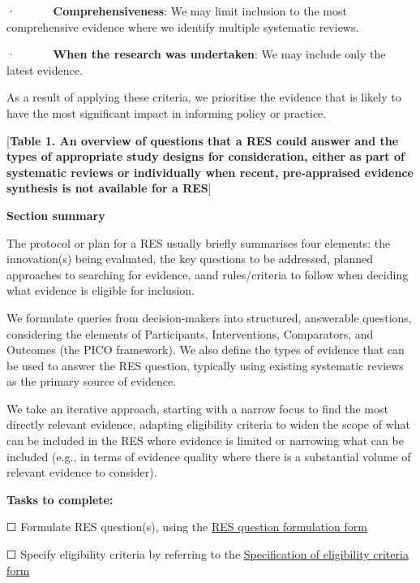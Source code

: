 \documentclass[
  letterpaper,
  DIV=11,
  numbers=noendperiod]{scrreprt}
\begin{document}
·~~~~~~ \textbf{Comprehensiveness}: We may limit inclusion to the most
comprehensive evidence where we identify multiple systematic reviews.

·~~~~~~ \textbf{When the research was undertaken}: We may include only
the latest evidence.

As a result of applying these criteria, we prioritise the evidence that
is likely to have the most significant impact in informing policy or
practice.

{[}\textbf{Table 1. An overview of questions that a RES could answer and
the types of appropriate study designs for consideration, either as part
of systematic reviews or individually when recent, pre-appraised
evidence synthesis is not available for a RES}{]}

\textbf{Section summary}

The protocol or plan for a RES usually briefly summarises four elements:
the innovation(s) being evaluated, the key questions to be addressed,
planned approaches to searching for evidence, aand rules/criteria to
follow when deciding what evidence is eligible for inclusion.

We formulate queries from decision-makers into structured, answerable
questions, considering the elements of Participants, Interventions,
Comparators, and Outcomes (the PICO framework). We also define the types
of evidence that can be used to answer the RES question, typically using
existing systematic reviews as the primary source of evidence.

We take an iterative approach, starting with a narrow focus to find the
most directly relevant evidence, adapting eligibility criteria to widen
the scope of what can be included in the RES where evidence is limited
or narrowing what can be included (e.g., in terms of evidence quality
where there is a substantial volume of relevant evidence to consider).

\textbf{Tasks to complete:}

☐ Formulate RES question(s), using the
\href{https://livemanchesterac-my.sharepoint.com/personal/chunhu_shi_manchester_ac_uk/Documents/Documents/Research/Projects/RES/Admin/RES\%20question\%20formulation\%20form.docx}{RES
question formulation form}

☐ Specify eligibility criteria by referring to the
\href{https://livemanchesterac-my.sharepoint.com/personal/chunhu_shi_manchester_ac_uk/Documents/Documents/Research/Projects/RES/Manual/Specification\%20of\%20eligibility\%20criteria\%20form.docx}{Specification
of eligibility criteria form}
\end{document}
